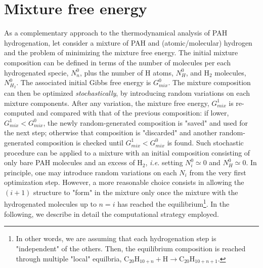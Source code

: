 \documentclass[a4paper, 11pt, twoside]{book}
\begin{document}
\section*{Mixture free energy}
As a complementary approach to the thermodynamical analysis of PAH hydrogenation, let consider a mixture of PAH and (atomic/molecular) hydrogen and the problem of minimizing the mixture free energy. The initial mixture composition can be defined in terms of the number of molecules per each hydrogenated specie, $N^0_n$, plus the number of H atoms, $N^0_H$, and $\text{H}_2$ molecules, $N^0_{H_2}$. The associated initial Gibbs free energy is $G_{mix}^0$. The mixture composition can then be optimized \emph{stochastically}, by introducing random variations on each mixture components. After any variation,  the mixture free energy, $G_{mix}^{1}$ is re-computed and compared with that of the previous composition: if lower, $G_{mix}^1 < G_{mix}^0$, the newly random-generated composition is "saved" and used for the next step; otherwise that composition is "discarded" and another random-generated composition is checked until $G_{mix}^1 < G_{mix}^0$ is found. Such stochastic procedure can be applied to a mixture with an initial composition consisting of only bare PAH molecules and an excess of $\text{H}_2$, \emph{i.e.} setting $N^0_i\simeq 0$ and $N^0_{H}\simeq 0$. In principle, one may introduce random variations on each $N_i$ from the very first optimization step. However, a more reasonable choice consists in allowing the $(i+1)$ structure to "form" in the mixture only once the mixture with the hydrogenated molecules up to $n=i$ has reached the equilibrium\footnote{In other words, we are assuming that each hydrogenation step is "independent" of the others. Then, the equilibrium composition is reached through multiple "local" equilbria, $\text{C}_{20}\text{H}_{10+n} + \text{H} \rightarrow \text{C}_{20}\text{H}_{10+n+1}$.}. In the following, we describe in detail the computational strategy employed.
\end{document}
